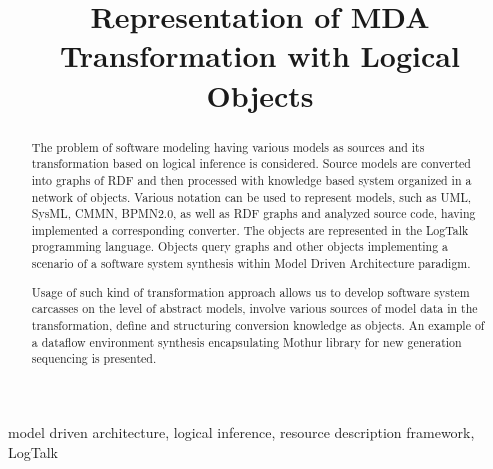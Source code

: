 \documentclass[conference]{IEEEtran}
\begin{document}
\title{Representation of MDA Transformation with Logical Objects}


\author{
}




\maketitle

\begin{abstract} %
  The problem of software modeling having various models as sources and its transformation based on logical inference is considered.  Source models are converted into graphs of RDF and then processed with knowledge based system organized in a network of objects.  Various notation can be used to represent models, such as UML, SysML, CMMN, BPMN2.0, as well as RDF graphs and analyzed source code, having implemented a corresponding converter.  The objects are represented in the LogTalk programming language.  Objects query graphs and other objects implementing a scenario of a software system synthesis within Model Driven Architecture paradigm.

  Usage of such kind of transformation approach allows us to develop software system carcasses on the level of abstract models, involve various sources of model data in the transformation, define and structuring conversion knowledge as objects.  An example of a dataflow environment synthesis encapsulating Mothur library for new generation sequencing is presented.
\end{abstract}

\begin{IEEEkeywords}
model driven architecture, logical inference, resource description framework, LogTalk
\end{IEEEkeywords}
\end{document}

